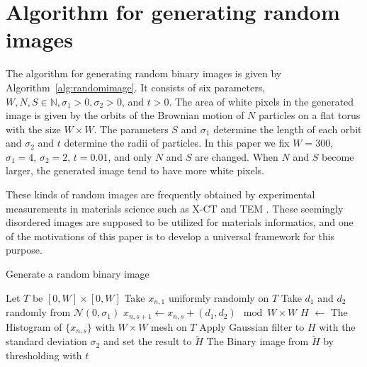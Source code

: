 \documentclass[smallextended]{svjour3}
\begin{document}
\appendix


\section{Algorithm for generating random images}
\label{sec:randomimage}

The algorithm for generating random binary images is given 
by Algorithm~\ref{alg:randomimage}. It consists of six parameters, $W, N, S\in \mathbb{N}, \sigma_1 > 0, \sigma_2 > 0$, and $t >0$.
The area of white pixels in the generated image
is given by the orbits of the Brownian motion of $N$ particles on a flat torus with the size $W \times W$. The parameters $S$ and $\sigma_1$ determine the length of each orbit and $\sigma_2$ and $t$ determine the radii of particles. In this paper we fix $W=300$, $\sigma_1 = 4$, $\sigma_2 = 2$, $t = 0.01$, and only $N$ and $S$ are changed. When $N$ and $S$ become larger, the generated image tend to have more white pixels. 

These kinds of random images are frequently obtained by experimental measurements in materials science such as X-CT and TEM \citep{iron}. These seemingly disordered images are supposed to be utilized for materials informatics, and one of the motivations of this paper is to develop a universal framework for this purpose. 

\begin{algorithm}[h!]
  \caption{Generate a random binary image}
  \label{alg:randomimage}
    \begin{algorithmic}
    \State Let $T$ be $[0, W]\times [0, W]$
      \State Take $x_{n,1}$ uniformly randomly on $T$
        \State Take $d_1$ and $d_2$ randomly from ${\mathcal N}(0, \sigma_1)$
        \State $x_{n,s+1} \gets x_{n,s} + (d_1, d_2) \mod W \times W$
      \EndFor
    \EndFor
    \State $H$ $\gets$ The Histogram of $\{x_{n,s}\}$ with $W\times W$
      mesh on $T$
    \State Apply Gaussian filter to $H$ with the standard deviation $\sigma_2$ and set the result to $\tilde{H}$
    \State \Return The Binary image from $\tilde{H}$ by thresholding with $t$
    \EndProcedure
  \end{algorithmic}

\end{algorithm}
\end{document}
